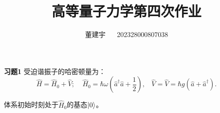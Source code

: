 \documentclass[reqno,a4paper,12pt]{amsart}
\title{高等量子力学第四次作业}
\author{董建宇 ~~ 202328000807038}
\begin{document}
\maketitle
\titleformat{\section}[hang]{\small}{\thesection}{0.8em}{}{}
\titleformat{\subsection}[hang]{\small}{\thesubsection}{0.8em}{}{}

\textbf{习题1} 受迫谐振子的哈密顿量为：
\[
	\hat{H} = \hat{H}_0 + \hat{V}; \ \ \ \ \ \hat{H}_0 = \hbar\omega( \hat{a}^\dagger\hat{a} + \frac{1}{2}), \ \ \ \ \hat{V} = \hat{V} = \hbar g(\hat{a}+\hat{a}^\dagger).
\]

体系初始时刻处于$\hat{H}_0$的基态$\ket{0}$。
\end{document}
